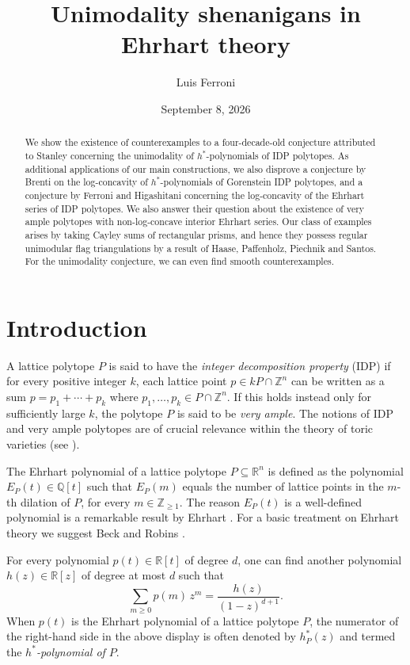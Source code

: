 \documentclass[11pt, letterpaper, english]{amsart}
\title{Unimodality shenanigans in Ehrhart theory}
\author[L.~Ferroni]{Luis Ferroni}
\date{September 8, 2026}
\theoremstyle{teoremas}
\theoremstyle{definition}
\begin{document}
\raggedbottom
\begin{abstract} 
We show the existence of counterexamples to a four-decade-old conjecture attributed to Stanley concerning the unimodality of $h^*$-polynomials of IDP polytopes. As additional applications of our main constructions, we also disprove a conjecture by Brenti on the log-concavity of $h^*$-polynomials of Gorenstein IDP polytopes, and a conjecture by Ferroni and Higashitani concerning the log-concavity of the Ehrhart series of IDP polytopes. We also answer their question about the existence of very ample polytopes with non-log-concave interior Ehrhart series. Our class of examples arises by taking Cayley sums of rectangular prisms, and hence they possess regular unimodular flag triangulations by a result of Haase, Paffenholz, Piechnik and Santos. For the unimodality conjecture, we can even find smooth counterexamples.
\end{abstract}

\maketitle

\section{Introduction}\label{sec:introduction}

A lattice polytope $P$ is said to have the \emph{integer decomposition property} (IDP) if for every positive integer $k$, each lattice point $p\in kP\cap\mathbb{Z}^n$ can be written as a sum $p = p_1+\cdots+p_k$ where $p_1,\ldots,p_k\in P\cap \mathbb{Z}^n$. If this holds instead only for sufficiently large $k$, the polytope $P$ is said to be \emph{very ample}. The notions of IDP and very ample polytopes are of crucial relevance within the theory of toric varieties (see \cite[Chapter~1]{cox-little-schenck}).

The Ehrhart polynomial of a lattice polytope $P\subseteq \mathbb{R}^n$ is defined as the polynomial $E_P(t) \in \mathbb{Q}[t]$ such that $E_P(m)$ equals the number of lattice points in the $m$-th dilation of $P$, for every $m\in \mathbb{Z}_{\geq 1}$. The reason $E_P(t)$ is a well-defined polynomial is a remarkable result by Ehrhart \cite{ehrhart}. For a basic treatment on Ehrhart theory we suggest Beck and Robins \cite{beck-robins}.

For every polynomial $p(t)\in \mathbb{R}[t]$ of degree $d$, one can find another polynomial $h(z)\in \mathbb{R}[z]$ of degree at most $d$ such that
    \[ \sum_{m\geq 0} p(m)\, z^m = \frac{h(z)}{(1-z)^{d+1}}.\]
When $p(t)$ is the Ehrhart polynomial of a lattice polytope $P$, the numerator of the right-hand side in the above display is often denoted by $h^*_P(z)$ and termed the \emph{$h^*$-polynomial of $P$}.
\end{document}
